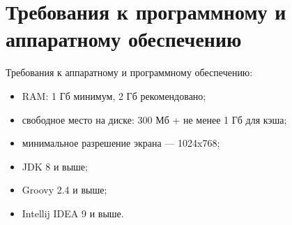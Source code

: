 \section{Требования к программному и аппаратному обеспечению} \label{sub23}

Требования к аппаратному и программному обеспечению: 

\begin{itemize}
\item{RAM: 1 Гб минимум, 2 Гб рекомендовано;}
\item{свободное место на диске: 300 Мб + не менее 1 Гб для кэша;}
\item{минимальное разрешение экрана — 1024x768;}
\item{JDK 8 и выше;}
\item{Groovy 2.4 и выше;}
\item{Intellij IDEA 9 и выше.}
\end{itemize}
